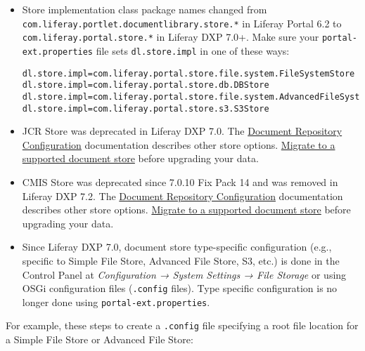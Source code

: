 \begin{itemize}
\item
  Store implementation class package names changed from
  \texttt{com.liferay.portlet.documentlibrary.store.*} in Liferay Portal
  6.2 to \texttt{com.liferay.portal.store.*} in Liferay DXP 7.0+. Make
  sure your \texttt{portal-ext.properties} file sets
  \texttt{dl.store.impl} in one of these ways:

\begin{verbatim}
dl.store.impl=com.liferay.portal.store.file.system.FileSystemStore
dl.store.impl=com.liferay.portal.store.db.DBStore
dl.store.impl=com.liferay.portal.store.file.system.AdvancedFileSystemStore
dl.store.impl=com.liferay.portal.store.s3.S3Store
\end{verbatim}
\item
  JCR Store was deprecated in Liferay DXP 7.0. The
  \href{/docs/7-2/deploy/-/knowledge_base/d/document-repository-configuration}{Document
  Repository Configuration} documentation describes other store options.
  \href{/docs/7-2/user/-/knowledge_base/u/server-administration}{Migrate
  to a supported document store} before upgrading your data.
\item
  CMIS Store was deprecated since 7.0.10 Fix Pack 14 and was removed in
  Liferay DXP 7.2. The
  \href{/docs/7-2/deploy/-/knowledge_base/d/document-repository-configuration}{Document
  Repository Configuration} documentation describes other store options.
  \href{/docs/7-2/user/-/knowledge_base/u/server-administration}{Migrate
  to a supported document store} before upgrading your data.
\item
  Since Liferay DXP 7.0, document store type-specific configuration
  (e.g., specific to Simple File Store, Advanced File Store, S3, etc.)
  is done in the Control Panel at \emph{Configuration → System Settings
  → File Storage} or using OSGi configuration files (\texttt{.config}
  files). Type specific configuration is no longer done using
  \texttt{portal-ext.properties}.
\end{itemize}

For example, these steps to create a \texttt{.config} file specifying a
root file location for a Simple File Store or Advanced File Store:

